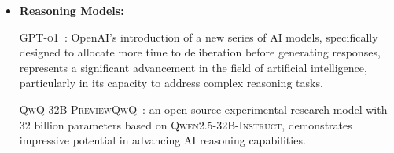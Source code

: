 {\begin{itemize}[topsep=5pt, leftmargin=1em]
    \textsc{DeepSeek-Math-7B-RL~\cite{shao2024deepseekmath}}: is trained on the foundation of \textsc{DeepSeek-Math-7B-Instruct} and is refined using the Group Relative Policy Optimization (GRPO) algorithm, further improving its problem-solving abilities. 


    \textsc{Qwen2.5-Math~\cite{yang2024qwen2}} series: We include 1.5B/7B/72B-Instruct represents an improvement over the earlier \textsc{Qwen2-Math} series by incorporating both CoT and TIR reasoning. 
    The \textsc{Qwen2.5-Math} series models achieve significant performance gains on mathematics benchmarks compared to their predecessors, demonstrating their enhanced reasoning and computational capabilities.

    
    \item \textbf{Reasoning Models:} 
 
    \textsc{GPT-o1}~\cite{openai_learning_to_reason_with_llms}: OpenAI's introduction of a new series of AI models, specifically designed to allocate more time to deliberation before generating responses, represents a significant advancement in the field of artificial intelligence, particularly in its capacity to address complex reasoning tasks.
    

    \textsc{QwQ-32B-Preview}\textsc{QwQ}~\cite{qwq-32b-preview}: an open-source experimental research model with 32 billion parameters based on \textsc{Qwen2.5-32B-Instruct}, demonstrates impressive potential in advancing AI reasoning capabilities.  
    

\end{itemize}}
